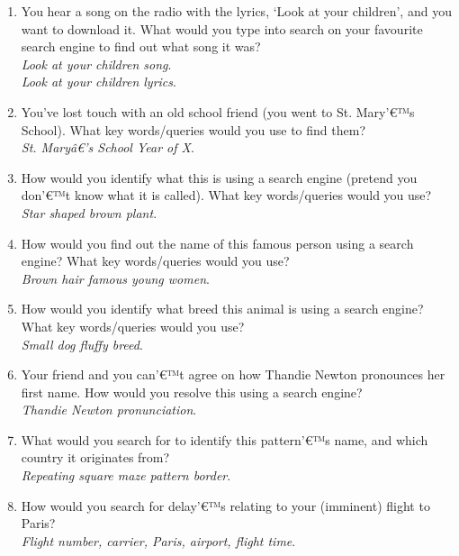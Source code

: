\documentclass[a4paper, 11pt]{article}
\begin{document}
\begin{enumerate}
\item{You hear a song on the radio with the lyrics, `Look at your children', and you want to download it. What would you type into search on your favourite search engine to find out what song it was?\\\textit{Look at your children song}. \\\textit{Look at your children lyrics}.}
\item{You've lost touch with an old school friend (you went to St. Mary'€™s School). What key words/queries would you use to find them?\\\textit{St. Maryâ€'s School Year of X}.}
\item{How would you identify what this is using a search engine (pretend you don'€™t know what it is called). What key words/queries would you use?\\\textit{Star shaped brown plant}.}
\item{How would you find out the name of this famous person using a search engine? What key words/queries would you use?\\\textit{Brown hair famous young women}.}
\item{How would you identify what breed this animal is using a search engine? What key words/queries would you use?\\\textit{Small dog fluffy breed}.}
\item{Your friend and you can'€™t agree on how Thandie Newton pronounces her first name. How would you resolve this using a search engine?\\\textit{Thandie Newton pronunciation}.}
\item{What would you search for to identify this pattern'€™s name, and which country it originates from?\\\textit{Repeating square maze pattern border}.}
\item{How would you search for delay'€™s relating to your (imminent) flight to Paris?\\\textit{Flight number, carrier, Paris, airport, flight time}.}
\end{enumerate}
\end{document}
